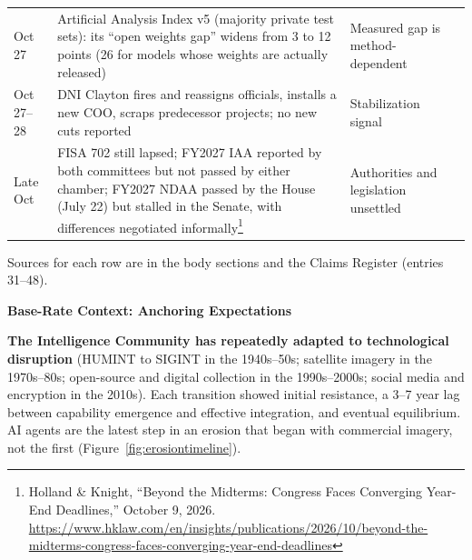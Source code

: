 \documentclass[11pt,letterpaper]{article}
\makeatletter
\newcommand{\etraneed}[1]{\par\if@nobreak\else\penalty\z@\ifdim\pagegoal<\maxdimen\ifdim\dimexpr\pagegoal-\pagetotal\relax<\dimexpr#1\relax\newpage\fi\fi\fi}
\makeatother
\begin{document}
\begin{criticalbox}
\begin{center}
\end{center}
\begin{center}
\scriptsize
\begin{tabularx}{\linewidth}{ZY{0.42}Y{1.70}Y{0.88}}
Oct 27 & Artificial Analysis Index v5 (majority private test sets): its ``open weights gap'' widens from 3 to 12 points (26 for models whose weights are actually released) & Measured gap is method-dependent \\
Oct 27--28 & DNI Clayton fires and reassigns officials, installs a new COO, scraps predecessor projects; no new cuts reported & Stabilization signal \\
Late Oct & FISA 702 still lapsed; FY2027 IAA reported by both committees but not passed by either chamber; FY2027 NDAA passed by the House (July 22) but stalled in the Senate, with differences negotiated informally\footnote{Holland \& Knight, ``Beyond the Midterms: Congress Faces Converging Year-End Deadlines,'' October 9, 2026. \url{https://www.hklaw.com/en/insights/publications/2026/10/beyond-the-midterms-congress-faces-converging-year-end-deadlines}} & Authorities and legislation unsettled \\
\bottomrule
\end{tabularx}
\end{center}
{\footnotesize Sources for each row are in the body sections and the Claims Register (entries 31--48).}
\end{criticalbox}

\etraneed{8\baselineskip}
\begin{center}
{\color{slatedark}\Large\bfseries Base-Rate Context: Anchoring Expectations}
\end{center}

\textbf{The Intelligence Community has repeatedly adapted to technological disruption} (HUMINT to SIGINT in the 1940s--50s; satellite imagery in the 1970s--80s; open-source and digital collection in the 1990s--2000s; social media and encryption in the 2010s). Each transition showed initial resistance, a 3--7 year lag between capability emergence and effective integration, and eventual equilibrium. AI agents are the latest step in an erosion that began with commercial imagery, not the first (Figure~\ref{fig:erosiontimeline}).
\end{document}
